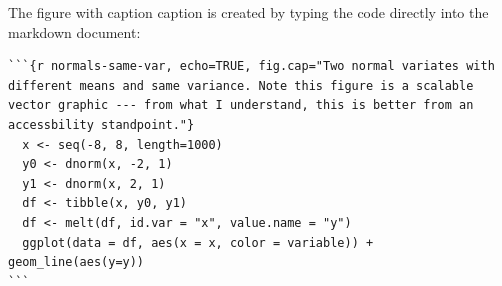 \documentclass[
]{article}
\begin{document}
The figure with caption caption is created by typing the code directly into the markdown document:

\begin{verbatim}
```{r normals-same-var, echo=TRUE, fig.cap="Two normal variates with different means and same variance. Note this figure is a scalable vector graphic --- from what I understand, this is better from an accessbility standpoint."}
  x <- seq(-8, 8, length=1000)
  y0 <- dnorm(x, -2, 1)
  y1 <- dnorm(x, 2, 1)
  df <- tibble(x, y0, y1)
  df <- melt(df, id.var = "x", value.name = "y")
  ggplot(data = df, aes(x = x, color = variable)) + geom_line(aes(y=y)) 
```
\end{verbatim}
\end{document}
